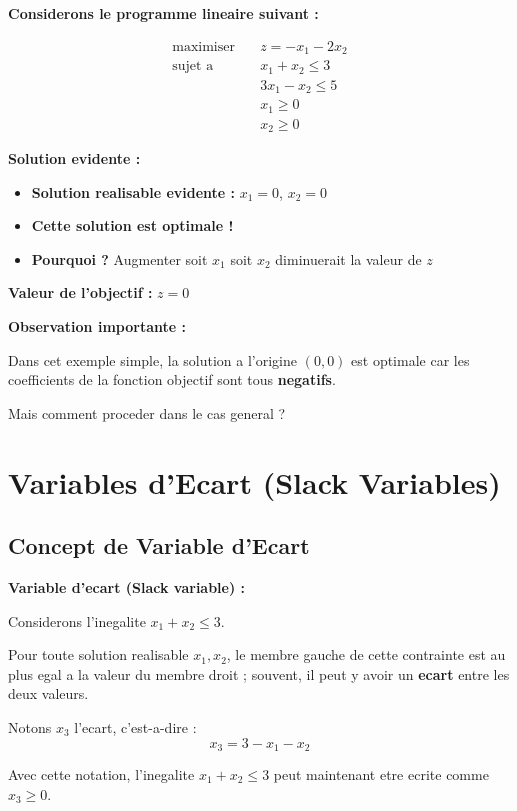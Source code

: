 \documentclass[12pt,a4paper]{article}
\begin{document}
\begin{exemple}
\textbf{Considerons le programme lineaire suivant :}

\begin{align*}
\text{maximiser} \quad & z = -x_1 - 2x_2\\
\text{sujet a} \quad & x_1 + x_2 \leq 3\\
& 3x_1 - x_2 \leq 5\\
& x_1 \geq 0\\
& x_2 \geq 0
\end{align*}
\end{exemple}

\begin{astuce}
\textbf{Solution evidente :}

\begin{itemize}
    \item \textcolor{defvert}{\textbf{Solution realisable evidente :}} $x_1 = 0$, $x_2 = 0$
    \item \textcolor{titrebleu}{\textbf{Cette solution est optimale !}}
    \item \textbf{Pourquoi ?} Augmenter soit $x_1$ soit $x_2$ diminuerait la valeur de $z$
\end{itemize}

\textbf{Valeur de l'objectif :} $z = 0$
\end{astuce}

\begin{notecours}
\textbf{Observation importante :}

Dans cet exemple simple, la solution a l'origine $(0,0)$ est optimale car les coefficients de la fonction objectif sont tous \textcolor{importantrouge}{\textbf{negatifs}}.

Mais comment proceder dans le cas general ?
\end{notecours}

\newpage
\section{Variables d'Ecart (Slack Variables)}

\subsection{Concept de Variable d'Ecart}

\begin{definition}
\textbf{Variable d'ecart (Slack variable) :}

Considerons l'inegalite $x_1 + x_2 \leq 3$.

Pour toute solution realisable $x_1, x_2$, le membre gauche de cette contrainte est au plus egal a la valeur du membre droit ; souvent, il peut y avoir un \textcolor{defvert}{\textbf{ecart}} entre les deux valeurs.

Notons $x_3$ l'ecart, c'est-a-dire :
$$x_3 = 3 - x_1 - x_2$$

Avec cette notation, l'inegalite $x_1 + x_2 \leq 3$ peut maintenant etre ecrite comme $x_3 \geq 0$.
\end{definition}
\end{document}
